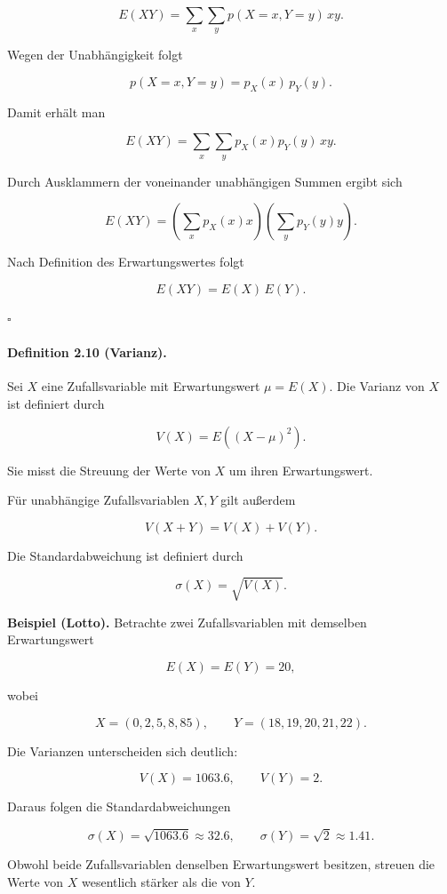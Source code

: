 \documentclass{article}
\begin{document}
\[
E(XY)
=
\sum_x\sum_y
p(X=x,Y=y)\,xy.
\]

Wegen der Unabhängigkeit folgt

\[
p(X=x,Y=y)
=
p_X(x)\,p_Y(y).
\]

Damit erhält man

\[
E(XY)
=
\sum_x\sum_y
p_X(x)p_Y(y)\,xy.
\]

Durch Ausklammern der voneinander unabhängigen Summen ergibt sich

\[
E(XY)
=
\left(\sum_x p_X(x)x\right)
\left(\sum_y p_Y(y)y\right).
\]

Nach Definition des Erwartungswertes folgt

\[
E(XY)=E(X)\,E(Y).
\]

\hfill\(\square\)

\medskip

\paragraph{Definition 2.10 (Varianz).}
Sei \(X\) eine Zufallsvariable mit Erwartungswert
\(\mu=E(X)\).
Die Varianz von \(X\) ist definiert durch

\[
V(X)=E\!\left((X-\mu)^2\right).
\]

Sie misst die Streuung der Werte von \(X\) um ihren Erwartungswert.

Für unabhängige Zufallsvariablen \(X,Y\) gilt außerdem

\[
V(X+Y)=V(X)+V(Y).
\]

Die Standardabweichung ist definiert durch

\[
\sigma(X)=\sqrt{V(X)}.
\]

\medskip

\textbf{Beispiel (Lotto).}
Betrachte zwei Zufallsvariablen mit demselben Erwartungswert

\[
E(X)=E(Y)=20,
\]

wobei

\[
X=(0,2,5,8,85),
\qquad
Y=(18,19,20,21,22).
\]

Die Varianzen unterscheiden sich deutlich:

\[
V(X)=1063.6,
\qquad
V(Y)=2.
\]

Daraus folgen die Standardabweichungen

\[
\sigma(X)=\sqrt{1063.6}\approx 32.6,
\qquad
\sigma(Y)=\sqrt{2}\approx 1.41.
\]

Obwohl beide Zufallsvariablen denselben Erwartungswert besitzen, streuen die Werte von \(X\) wesentlich stärker als die von \(Y\).
\end{document}
